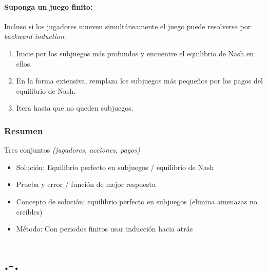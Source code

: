 \documentclass[letterpaper,12pt,twocolumn]{report}
\begin{document}
\subsubsection*{Suponga un juego finito:}
Incluso si los jugadores mueven simultáneamente el juego puede resolverse por \textit{backward induction}.

\begin{enumerate}
	\item Inicie por los subjuegos más profundos y encuentre el equilibrio de Nash en ellos.
	\item En la forma extensiva, remplaza los subjuegos más pequeños por los pagos del equilibrio de Nash.
	\item Itera hasta que no queden subjuegos.
\end{enumerate}

 \subsection*{Resumen}
 
 \begin{tcolorbox}[title= Juego en forma normal]
 	Tres conjuntos \textit{(jugadores, acciones, pagos)}
 	
 	\begin{itemize}
 		\item Solución: Equilibrio perfecto en subjuegos / equilibrio de Nash
 		\item Prueba y error / función de mejor respuesta
 	\end{itemize}
 	
 \end{tcolorbox}
 
 \begin{tcolorbox}[title= Juegos en forma extensiva]
 	\begin{itemize}
 		\item Concepto de solución: equilibrio perfecto en subjuegos (elimina amenazas no creíbles)
 		\item Método: Con periodos finitos usar inducción hacia atrás
 	\end{itemize}
 \end{tcolorbox}

\chapter{.-.}
\end{document}
